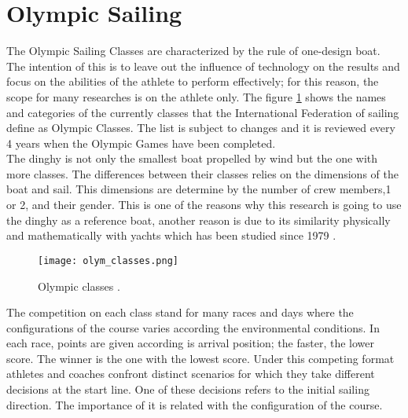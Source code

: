 \section {Olympic Sailing} \label{sec:olympic classes}
The Olympic Sailing Classes are characterized by the rule of one-design boat. The intention of this is to leave out the influence of technology on the results and focus on the abilities of the athlete to perform effectively; for this reason, the scope for many researches is on the athlete only. The figure \ref{fig:olymp_cla} shows the names and categories of the currently classes that the International Federation of sailing define as Olympic Classes. The list is subject to changes and it is reviewed every 4 years when the Olympic Games have been completed.\\
The dinghy is not only the smallest boat propelled by wind but the one with more classes. The differences between their classes relies on the dimensions of the boat and sail. This dimensions are determine by the number of crew members,1 or 2, and their gender. This is one of the reasons why this research is going to use the dinghy as a reference boat, another reason is due to its similarity physically and mathematically with yachts which has been studied since 1979 \cite{marchajaereo1979}. \\

\begin{figure}[ht]
\centering
 \texttt{[image: olym\_classes.png]}
  \caption{Olympic classes \cite{sailoly}.}
\label{fig:olymp_cla} 
\end{figure}

The competition on each class stand for many races and days where the configurations of the course varies according the environmental conditions. In each race, points are given according is arrival position; the faster, the lower score. The winner is the one with the lowest score. Under this competing format athletes and coaches confront distinct scenarios for which they take different decisions at the start line. One of these decisions refers to the initial sailing direction. The importance of it is related with the configuration of the course.\\

